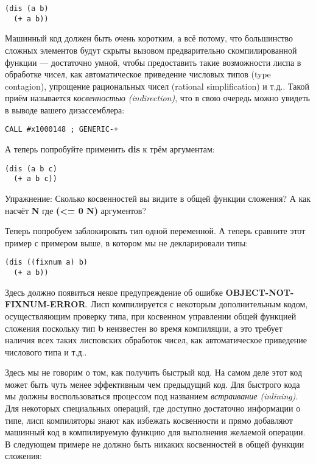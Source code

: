 \begin{verbatim}
(dis (a b)
  (+ a b))
\end{verbatim}

Машинный код должен быть очень коротким, а всё потому, что большинство сложных элементов будут скрыты вызовом предварительно скомпилированной функции --- достаточно умной, чтобы предоставить такие возможности лиспа в обработке чисел, как автоматическое приведение числовых типов (type contagion), упрощение рациональных чисел (rational simplification) и т.д.. Такой приём называется \emph{косвенностью (indirection)}, что в свою очередь можно увидеть в выводе вашего дизассемблера:

\begin{verbatim}
CALL #x1000148 ; GENERIC-+
\end{verbatim}

А теперь попробуйте применить \textbf{dis} к трём аргументам:

\begin{verbatim}
(dis (a b c)
  (+ a b c))
\end{verbatim}

Упражнение: Сколько косвенностей вы видите в общей функции сложения? А как насчёт \textbf{N} где \textbf{(<= 0 N)} аргументов?

Теперь попробуем заблокировать тип одной переменной. А теперь сравните этот пример с примером выше, в котором мы не декларировали типы:

\begin{verbatim}
(dis ((fixnum a) b)
  (+ a b))
\end{verbatim}

Здесь должно появиться некое предупреждение об ошибке \textbf{OBJECT-NOT-FIXNUM-ERROR}. Лисп компилируется с некоторым дополнительным кодом, осуществляющим проверку типа, при косвенном управлении общей функцией сложения поскольку тип \textbf{b} неизвестен во время компиляции, а это требует наличия всех таких лисповских обработок чисел, как автоматическое приведение числового типа и т.д..

Здесь мы не говорим о том, как получить быстрый код. На самом деле этот код может быть чуть менее эффективным чем предыдущий код. Для быстрого кода мы должны воспользоваться процессом под названием \emph{встраивание (inlining)}. Для некоторых специальных операций, где доступно достаточно информации о типе, лисп компиляторы знают как избежать косвенности и прямо добавляют машинный код в компилируемую функцию для выполнения желаемой операции. В следующем примере не должно быть никаких косвенностей в общей функции сложения:

